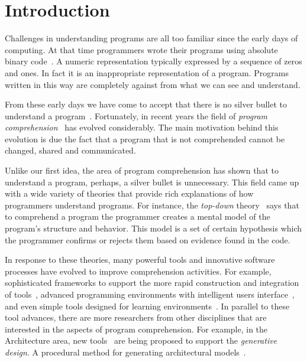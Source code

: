 
% 
% 

\section{Introduction}

Challenges in understanding programs are all too familiar since the early days of computing. At that time programmers wrote their programs using absolute binary code~\cite{hamming2003art}. A numeric representation typically expressed by a sequence of zeros and ones. In fact it is an inappropriate representation of a program. Programs written in this way are completely against from what we can see and understand.

From these early days we have come to accept that there is no silver bullet to understand a program~\cite{bullet1987essence}. Fortunately, in recent years the field of \textit{program comprehension}~\cite{rugaber1995program} has evolved considerably. The main motivation behind this evolution is due the fact that a program that is not comprehended cannot be changed, shared and communicated. 

Unlike our first idea, the area of program comprehension has shown that to understand a program, perhaps, a silver bullet is unnecessary. This field came up with a wide variety of theories that provide rich explanations of how programmers understand programs. For instance, the \textit{top-down} theory~\cite{brooks1977towards} says that to comprehend a program the programmer creates a mental model of the program's structure and behavior. This model is a set of certain hypothesis which the programmer confirms or rejects them based on evidence found in the code.

In response to these theories, many powerful tools and innovative software processes have evolved to improve comprehension activities. For example, sophisticated frameworks to support the more rapid construction and integration of tools~\cite{DesRivieres2004}, advanced programming environments with intelligent users interface~\cite{carlson2005eclipse,boudreau2002netbeans,intellij2001intellij,guckenheimer2006software}, and even simple tools designed for learning environments~\cite{papert1980mindstorms,Kay1993,Reas2006,findler2002drscheme,GuoSIGCSE2013,mcdirmid2013usable}. In parallel to these tool advances, there are more researchers from other disciplines that are interested in the aspects of program comprehension. For example, in the Architecture area, new tools~\cite{aish2012designscript,lopes2011portable} are being proposed to support the \textit{generative design}. A procedural method for generating architectural models~\cite{mccormack2004generative}.

